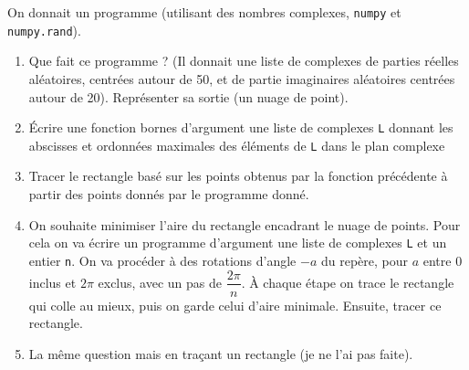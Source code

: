 \documentclass[10pt,fleqn]{article} %
\begin{document}
On donnait un programme (utilisant des nombres complexes, \texttt{numpy} et \texttt{numpy.rand}).
\begin{enumerate}
\item Que fait ce programme ? (Il donnait une liste de complexes de parties réelles aléatoires, centrées autour de 50, et de partie imaginaires aléatoires centrées autour de 20). Représenter sa sortie (un nuage de point).
\item  Écrire une fonction bornes d'argument une liste de complexes \texttt{L} donnant les abscisses et ordonnées maximales des éléments de \texttt{L} dans le plan complexe
\item  Tracer le rectangle basé sur les points obtenus par la fonction précédente à partir des points donnés par le programme donné.
\item  On souhaite minimiser l'aire du rectangle encadrant le nuage de points. Pour cela on va écrire un programme d'argument une liste de complexes \texttt{L} et un entier \texttt{n}.
On va procéder à des rotations d'angle $-a$ du repère, pour $a$ entre 0 inclus et $2\pi$ exclus, avec un pas de $\dfrac{2\pi}{n}$. À chaque étape on trace le rectangle qui colle au mieux, puis on garde celui d'aire minimale. Ensuite, tracer ce rectangle.
\item La même question mais en traçant un rectangle (je ne l'ai pas faite).
\end{enumerate}
\newpage 
\end{document}

